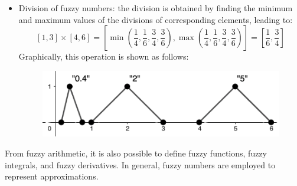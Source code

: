 \documentclass[12pt, a4paper]{report}
\begin{document}
\begin{example}
\begin{itemize}
\begin{figure}[H]
                \end{figure}
            \item Division of fuzzy numbers: the division is obtained by finding the minimum and maximum values of the divisions of corresponding elements, leading to:
            \[[1,3] \times [4,6]=\left[\min\left(\dfrac{1}{4}, \dfrac{1}{6}, \dfrac{3}{4}, \dfrac{3}{6}\right),\max\left(\dfrac{1}{4}, \dfrac{1}{6}, \dfrac{3}{4}, \dfrac{3}{6}\right)\right]=\left[\dfrac{1}{6},\dfrac{3}{4}\right]\]
            Graphically, this operation is shown as follows:
                \begin{figure}[H]
                    \centering
                    \includegraphics[width=0.5\linewidth]{images/division.png}
                \end{figure}
        \end{itemize}
    \end{example}
    From fuzzy arithmetic, it is also possible to define fuzzy functions, fuzzy integrals, and fuzzy derivatives. 
    In general, fuzzy numbers are employed to represent approximations.
\end{document}
